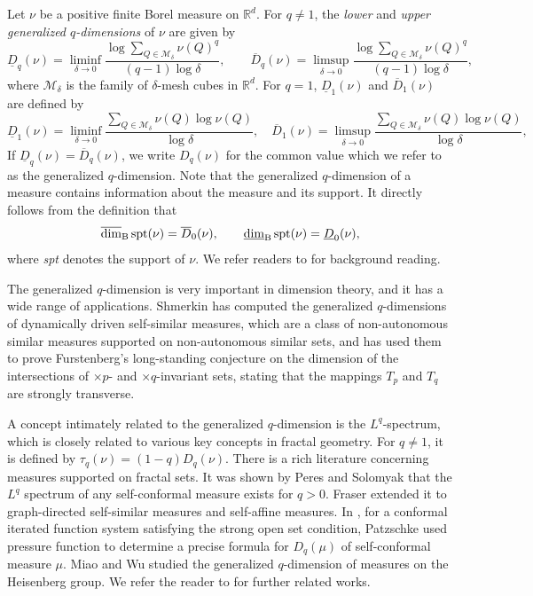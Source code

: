 \documentclass[12pt]{amsart}
\theoremstyle{plain}
\theoremstyle{definition}
\theoremstyle{remark}
\newcommand\ubd{\overline{\mbox{\rm dim}}_{\rm B}\,} %
\newcommand\lbd{\underline{\mbox{\rm dim}}_{\rm B}\,} %
\begin{document}
Let $\nu$ be a positive finite Borel measure on $\mathbb{R}^d$. For $q\not=1$, the {\it lower} and {\it upper generalized $q$-dimensions} of $\nu$ are given by
\begin{equation}\label{Dq}
\underline{D}_q(\nu)=\liminf_{\delta\to 0}\frac{\log \sum_{Q\in{\mathcal{M}_\delta}}\nu(Q)^q}{(q-1)\log \delta},  \qquad   \overline{D}_q(\nu)=\limsup_{\delta\to 0}\frac{\log \sum_{Q\in{\mathcal{M}_\delta}}\nu(Q)^q}{(q-1)\log \delta},
\end{equation}
where $\mathcal{M}_\delta$ is the family of $\delta$-mesh cubes in $\mathbb{R}^d$. For $q=1$, $\underline{D}_1(\nu)$ and $\overline{D}_1(\nu)$ are defined by
\begin{equation}\label{D1}
\underline{D}_1(\nu)=\liminf_{\delta\to 0}\frac{ \sum_{{Q\in\mathcal{M}_\delta}}\nu(Q)\log\nu(Q)}{\log \delta},  \quad   \overline{D}_1(\nu)=\limsup_{\delta\to 0}\frac{ \sum_{{Q\in\mathcal{M}_\delta}}\nu(Q)\log\nu(Q)}{\log \delta},
\end{equation}
If $\underline{D}_q(\nu)=\overline{D}_q(\nu)$, we write ${D}_q(\nu)$ for the common value which we refer to as the generalized $q$-dimension. Note that the generalized $q$-dimension of a measure contains information about the measure and its support. It directly follows from the definition that
$$
\ubd \mbox{spt}(\nu)=\overline{D}_0(\nu),  \qquad  \lbd \mbox{spt}(\nu)=\underline{D}_0(\nu),
$$
where {\it spt} denotes the support of $\nu$. We refer readers to \cite{Fal, YB} for  background reading.


The generalized $q$-dimension is very important in dimension theory, and it has a wide range of applications. Shmerkin \cite{S} has computed the generalized $q$-dimensions of dynamically driven self-similar measures, which are a class of non-autonomous similar measures supported on non-autonomous similar sets, and has used them to prove Furstenberg's long-standing conjecture on the dimension of the intersections of $\times p$- and $\times q$-invariant sets, stating that the mappings $T_p$ and $T_q$ are strongly transverse.

A concept intimately related to the generalized $q$-dimension is the $L^q$-spectrum, which is closely related to various key concepts in fractal geometry. For $q \neq 1$, it is defined by $\tau_q(\nu) = (1-q)D_q(\nu)$. There is a rich literature concerning measures supported on fractal sets. It was shown by Peres and Solomyak \cite{BS} that the $L^q$ spectrum of any self-conformal measure exists for $q > 0$.   Fraser \cite{JMF}   extended it to graph-directed self-similar measures and self-affine measures.  In \cite{PN}, for a conformal iterated function system satisfying the strong open set condition, Patzschke used pressure function to  determine a precise formula for  $D_q(\mu)$ of self-conformal measure $\mu$. Miao and Wu \cite{MWu}  studied the generalized $q$-dimension of measures on the Heisenberg group. We refer the reader to \cite{Falco05,Falco10,FFL,FX,F,JMF,K,SMN,SX,YYL} for further related works.
\end{document}
